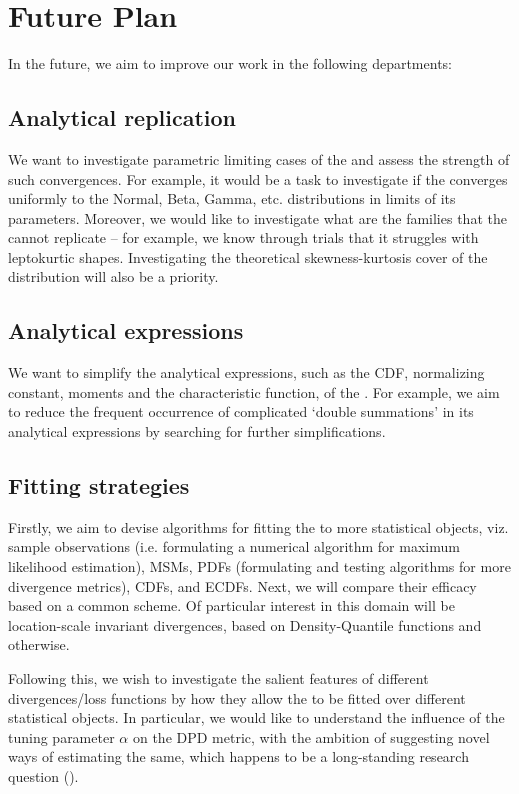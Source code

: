 \renewcommand{\vector}[1]{\underset{\sim}{#1}}
\section{Future Plan}
In the future, we aim to improve our work in the following departments:

\subsection{Analytical replication}
We want to investigate parametric limiting cases of the \sindist{} and assess the strength of such convergences. For example, it would be a task to investigate if the \sindist{} converges uniformly to the Normal, Beta, Gamma, etc. distributions in limits of its parameters. Moreover, we would like to investigate what are the families that the \sindist{} cannot replicate -- for example, we know through trials that it struggles with leptokurtic shapes. Investigating the theoretical skewness-kurtosis cover of the distribution will also be a priority.

\subsection{Analytical expressions}
We want to simplify the analytical expressions, such as the CDF, normalizing constant, moments and the characteristic function, of the \sindist. For example, we aim to reduce the frequent occurrence of complicated `double summations' in its analytical expressions by searching for further simplifications.

\subsection{Fitting strategies}
Firstly, we aim to devise algorithms for fitting the \sindist{} to more statistical objects, viz. sample observations (i.e. formulating a numerical algorithm for maximum likelihood estimation), MSMs, PDFs (formulating and testing algorithms for more divergence metrics), CDFs, and ECDFs. Next, we will compare their efficacy based on a common scheme. Of particular interest in this domain will be location-scale invariant divergences, based on Density-Quantile functions and otherwise.

Following this, we wish to investigate the salient features of different divergences/loss functions by how they allow the \sindist{} to be fitted over different statistical objects. In particular, we would like to understand the influence of the tuning parameter $\alpha$ on the DPD metric, with the ambition of suggesting novel ways of estimating the same, which happens to be a long-standing research question (\cite{basak2021dpd}).


